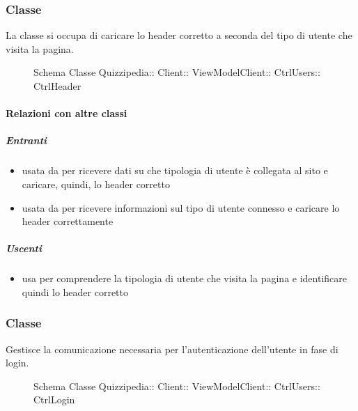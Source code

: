 \subsubsection{Classe }
La classe si occupa di caricare lo header corretto a seconda del tipo di utente che visita la pagina.
\begin{figure}[H]
\centering
\noindent{}
\caption[Schema Classe CtrlHeader]{Schema Classe Quizzipedia:: Client:: ViewModelClient:: CtrlUsers:: CtrlHeader}
\end{figure}
\paragraph{Relazioni con altre classi}
\subparagraph{Entranti}
\begin{itemize}
\item usata da  per ricevere dati su che tipologia di utente è collegata al sito e caricare, quindi, lo header corretto
\item usata da  per ricevere informazioni sul tipo di utente connesso e caricare lo header correttamente
\end{itemize}
\subparagraph{Uscenti}
\begin{itemize}
\item usa  per comprendere la tipologia di utente che visita la pagina e identificare quindi lo header corretto
\end{itemize}
\subsubsection{Classe }
Gestisce la comunicazione necessaria per l'autenticazione dell'utente in fase di login.
\begin{figure}[H]
\centering
\noindent{}
\caption[Schema Classe CtrlLogin]{Schema Classe Quizzipedia:: Client:: ViewModelClient:: CtrlUsers:: CtrlLogin}
\end{figure}
